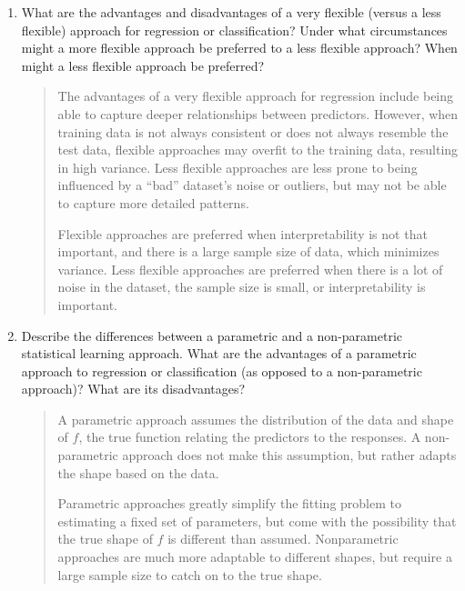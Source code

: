 \documentclass[11pt]{article}
\newenvironment{answer}{
\begin{quote}}{
\end{quote}}
\begin{document}
\begin{enumerate}
  \item What are the advantages and disadvantages of a very flexible (versus
    a less flexible) approach for regression or classification? Under what
    circumstances might a more flexible approach be preferred to a less
    flexible approach? When might a less flexible approach be preferred?
    \begin{answer}
      The advantages of a very flexible approach for regression
      include being able to capture deeper relationships between
      predictors. However, when training data is not always
      consistent or does not always resemble the test data, flexible
      approaches may overfit to the training data, resulting in high
      variance. Less flexible approaches are less prone to being
      influenced by a ``bad'' dataset's noise or outliers, but may
      not be able to capture more detailed patterns.

      Flexible approaches are preferred when interpretability is not
      that important, and there is a large sample size of data, which
      minimizes variance. Less flexible approaches are preferred when
      there is a lot of noise in the dataset, the sample size is
      small, or interpretability is important.
    \end{answer}

  \item Describe the differences between a parametric and a non-parametric
    statistical learning approach. What are the advantages of a
    parametric approach to regression or classification (as opposed
    to a non-parametric approach)? What are its disadvantages?
    \begin{answer}
      A parametric approach assumes the distribution of the data and
      shape of $f$, the true function relating the predictors to the
      responses. A non-parametric approach does not make this
      assumption, but rather adapts the shape based on the data.

      Parametric approaches greatly simplify the fitting problem to
      estimating a fixed set of parameters, but come with the
      possibility that the true shape of $f$ is different than
      assumed. Nonparametric approaches are much more adaptable to
      different shapes, but require a large sample size to catch on
      to the true shape.
    \end{answer}


\end{enumerate}
\end{document}
